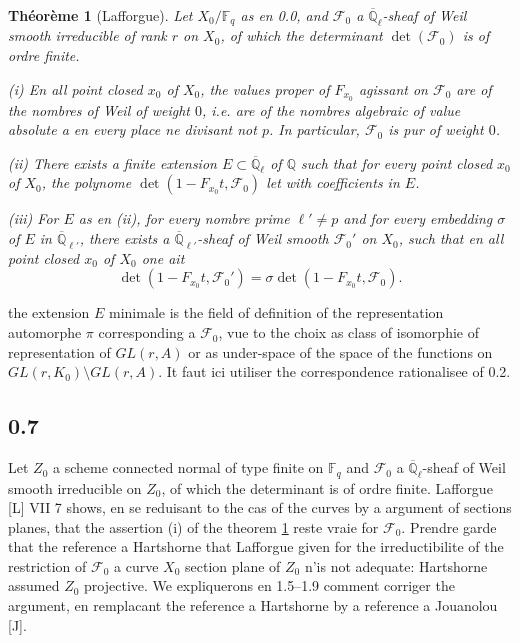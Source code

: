 \documentclass[11pt,a4paper]{article}
\theoremstyle{plain}
\newtheorem{theorem}{Th\'eor\`eme}
\theoremstyle{definition}
\begin{document}
\begin{theorem}[Lafforgue]\label{thm:0.6}
Let $X_0/\mathbb{F}_q$ as en 0.0, and $\mathcal{F}_0$ a $\overline{\mathbb{Q}}_\ell$-sheaf of Weil smooth irreducible of rank $r$ on $X_0$, of which the determinant $\det(\mathcal{F}_0)$ is of ordre finite.

\emph{(i)} En all point closed $x_0$ of $X_0$, the values proper of $F_{x_0}$ agissant on $\mathcal{F}_0$ are of the nombres of Weil of weight $0$, i.e. are of the nombres algebraic of value absolute a en every place ne divisant not $p$. In particular, $\mathcal{F}_0$ is pur of weight $0$.

\emph{(ii)} There exists a finite extension $E \subset \overline{\mathbb{Q}}_\ell$ of $\mathbb{Q}$ such that for every point closed $x_0$ of $X_0$, the polynome $\det(1 - F_{x_0}t, \mathcal{F}_0)$ let with coefficients in $E$.

\emph{(iii)} For $E$ as en (ii), for every nombre prime $\ell' \neq p$ and for every embedding $\sigma$ of $E$ in $\overline{\mathbb{Q}}_{\ell'}$, there exists a $\overline{\mathbb{Q}}_{\ell'}$-sheaf of Weil smooth $\mathcal{F}_0'$ on $X_0$, such that en all point closed $x_0$ of $X_0$ one ait
\[
\det(1 - F_{x_0}t, \mathcal{F}_0') = \sigma \det(1 - F_{x_0}t, \mathcal{F}_0).
\]
\end{theorem}

the extension $E$ minimale is the field of definition of the representation automorphe $\pi$ corresponding a $\mathcal{F}_0$, vue to the choix as class of isomorphie of representation of $GL(r,A)$ or as under-space of the space of the functions on $GL(r,K_0) \setminus GL(r,A)$. It faut ici utiliser the correspondence rationalisee of 0.2.

\subsection*{0.7}

Let $Z_0$ a scheme connected normal of type finite on $\mathbb{F}_q$ and $\mathcal{F}_0$ a $\overline{\mathbb{Q}}_\ell$-sheaf of Weil smooth irreducible on $Z_0$, of which the determinant is of ordre finite. Lafforgue [L] VII 7 shows, en se reduisant to the cas of the curves by a argument of sections planes, that the assertion (i) of the theorem \ref{thm:0.6} reste vraie for $\mathcal{F}_0$. Prendre garde that the reference a Hartshorne that Lafforgue given for the irreductibilite of the restriction of $\mathcal{F}_0$ a curve $X_0$ section plane of $Z_0$ n'is not adequate: Hartshorne assumed $Z_0$ projective. We expliquerons en 1.5--1.9 comment corriger the argument, en remplacant the reference a Hartshorne by a reference a Jouanolou [J].
\end{document}
